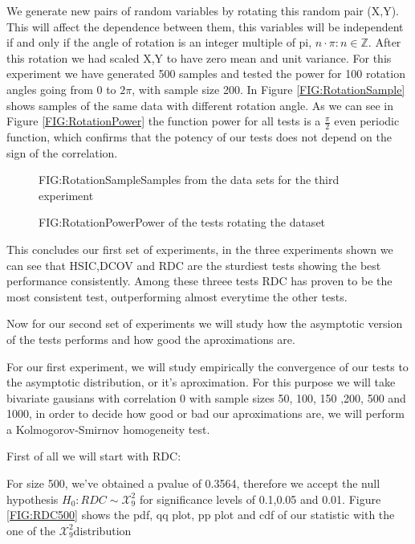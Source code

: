 We generate new pairs of random variables by rotating this random pair (X,Y). This will affect the dependence between them, this variables will be independent if and only if the angle of rotation is an integer multiple of pi, $n\cdot\pi : n\in\mathbb{Z}$. After this rotation we had scaled X,Y to have zero mean and unit variance.
For this experiment we have generated 500 samples and tested the power for 100 rotation angles going from 0 to $2\pi$, with sample size 200. In Figure \ref{FIG:RotationSample} shows samples of the same data with different rotation angle.
As we can see in Figure \ref{FIG:RotationPower} the function power for all tests is a $\frac{\pi}{2}$ even periodic function, which confirms that the potency of our tests does not depend on the sign of the correlation.

\begin{figure}[Experiment 3 rotation pattern sample]{FIG:RotationSample}{Samples from the data sets for the third experiment}
\end{figure}
\begin{figure}[Experiment 3 results]{FIG:RotationPower}{Power of the tests rotating the dataset}
\end{figure}

This concludes our first set of experiments, in the three experiments shown we can see that HSIC,DCOV and RDC are the sturdiest tests showing the best performance consistently. Among these threee tests RDC has proven to be the most consistent test, outperforming almost everytime the other tests. 

Now for our second set of experiments we will study how the asymptotic version of the tests performs and how good the aproximations are.

For our first experiment, we will study empirically the convergence of our tests to the asymptotic distribution, or it's aproximation. For this purpose we will take  bivariate gausians with correlation 0 with sample sizes  50, 100, 150 ,200, 500 and 1000, in order to decide how good or bad our aproximations are, we will perform a Kolmogorov-Smirnov homogeneity test.

First of all we will start with RDC:

For size 500, we've obtained a pvalue of 0.3564, therefore we accept the null hypothesis $H_{0}: RDC\sim \mathcal{X}^{2}_{9}$ for significance levels of 0.1,0.05 and 0.01. Figure \ref{FIG:RDC500} shows the pdf, qq plot, pp plot and cdf of our statistic with the one of the $\mathcal{X}^{2}_{9}$distribution

